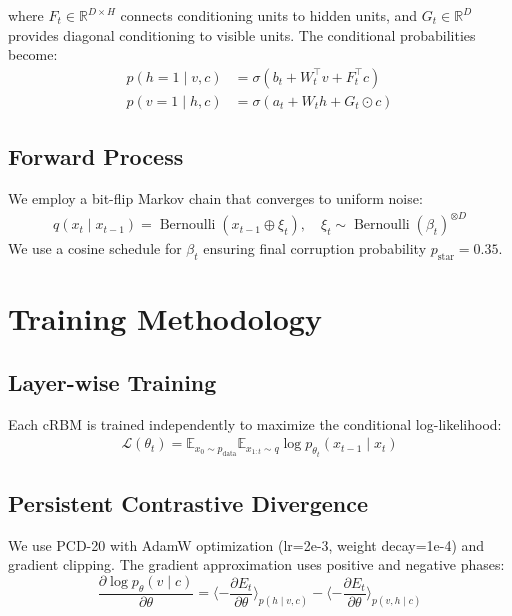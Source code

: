 \documentclass[11pt]{article}
\begin{document}
where $F_t \in \mathbb{R}^{D \times H}$ connects conditioning units to hidden units, and $G_t \in \mathbb{R}^{D}$ provides diagonal conditioning to visible units. The conditional probabilities become:
\begin{align}
p(h=1\mid v,c) &= \sigma(b_t + W_t^\top v + F_t^\top c) \\
p(v=1\mid h,c) &= \sigma(a_t + W_t h + G_t \odot c)
\end{align}

\subsection{Forward Process}

We employ a bit-flip Markov chain that converges to uniform noise:
\begin{align}
q(x_t \mid x_{t-1}) = \operatorname{Bernoulli}(x_{t-1} \oplus \xi_t), \quad \xi_t \sim \operatorname{Bernoulli}(\beta_t)^{\otimes D}
\end{align}
We use a cosine schedule for $\beta_t$ ensuring final corruption probability $p_{\text{star}} = 0.35$.

\section{Training Methodology}

\subsection{Layer-wise Training}
Each cRBM is trained independently to maximize the conditional log-likelihood:
\begin{align}
\mathcal{L}(\theta_t) = \mathbb{E}_{x_0\sim p_{\text{data}}} \mathbb{E}_{x_{1:t}\sim q} \log p_{\theta_t}(x_{t-1}\mid x_t)
\end{align}

\subsection{Persistent Contrastive Divergence}
We use PCD-20 with AdamW optimization (lr=2e-3, weight decay=1e-4) and gradient clipping. The gradient approximation uses positive and negative phases:
\begin{equation}
\frac{\partial \log p_\theta(v \mid c)}{\partial \theta} = \langle -\frac{\partial E_t}{\partial \theta} \rangle_{p(h \mid v, c)} - \langle -\frac{\partial E_t}{\partial \theta} \rangle_{p(v,h \mid c)}
\end{equation}
\end{document}

